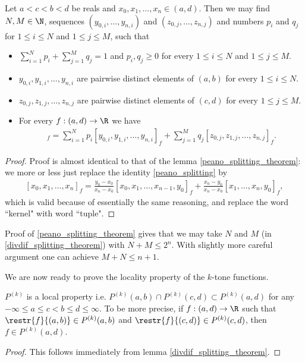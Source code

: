 \begin{lem}\label{divdif_splitting_theorem}
	Let $a < c < b < d$ be reals and $x_{0}, x_{1}, \ldots, x_{n} \in (a, d)$. Then we may find $N, M \in \N$, sequences $(y_{0, i}, \ldots, y_{n, i})$ and $(z_{0, j}, \ldots, z_{n, j})$ and numbers $p_{i}$ and $q_{j}$ for $1 \leq i \leq N$ and $1 \leq j \leq M$, such that
	\begin{itemize}
		\item $\sum_{i = 1}^{N} p_{i} + \sum_{j = 1}^{M} q_{j} = 1$ and $p_{i}, q_{j} \geq 0$ for every $1 \leq i \leq N$ and $1 \leq j \leq M$.
		\item $y_{0, i}, y_{1, i}, \ldots, y_{n, i}$ are pairwise distinct elements of $(a, b)$ for every $1 \leq i \leq N$.
		\item $z_{0, j}, z_{1, j}, \ldots, z_{n, j}$ are pairwise distinct elements of $(c, d)$ for every $1 \leq j \leq M$.
		\item For every $f : (a, d) \to \R$ we have
		\begin{align*}
			[x_{0}, x_{1}, \ldots, x_{n}]_{f} = \sum_{i = 1}^{N} p_{i} [y_{0, i}, y_{1, i}, \ldots, y_{n, i}]_{f} +  \sum_{j = 1}^{M} q_{j} [z_{0, j}, z_{1, j}, \ldots, z_{n, j}]_{f}.
		\end{align*}
	\end{itemize}
\end{lem}
\begin{proof}
	Proof is almost identical to that of the lemma \ref{peano_splitting_theorem}: we more or less just replace the identity \ref{peano_splitting} by
	\begin{align}\label{divdif_splitting_property}
		[x_{0}, x_{1}, \ldots, x_{n}]_{f} = \frac{y_{0} - x_{0}}{x_{n} - x_{0}} [x_{0}, x_{1}, \ldots, x_{n - 1}, y_{0}]_{f} + \frac{x_{n} - y_{0}}{x_{n} - x_{0}} [x_{1}, \ldots, x_{n}, y_{0}]_{f},
	\end{align}
	which is valid because of essentially the same reasoning, and replace the word ``kernel" with word ``tuple".
\end{proof}

Proof of \ref{peano_splitting_theorem} gives that we may take $N$ and $M$ (in \ref{divdif_splitting_theorem}) with $N + M \leq 2^{n}$. With slightly more careful argument one can achieve $M + N \leq n + 1$.

We are now ready to prove the locality property of the $k$-tone functions.

\begin{prop}\label{k_tone_local}
	$P^{(k)}$ is a local property i.e. $P^{(k)}(a, b) \cap P^{(k)}(c, d) \subset P^{(k)}(a, d)$ for any $-\infty \leq a \leq c < b \leq d \leq \infty$. To be more precise, if $f : (a, d) \to \R$ such that $\restr{f}{(a, b)} \in P^{(k)}(a, b)$ and $\restr{f}{(c, d)} \in P^{(k)}(c, d)$, then $f \in P^{(k)}(a, d)$.
\end{prop}
\begin{proof}
	This follows immediately from lemma \ref{divdif_splitting_theorem}.
\end{proof}

